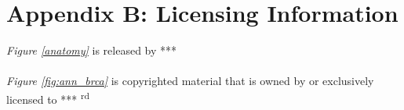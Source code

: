 \documentclass[../thesis.tex]{subfiles}
\begin{document}
\chapter*{Appendix B: Licensing Information}
\label{sec:licensing}

\emph{Figure \ref{anatomy}} is released by ***
\\\\
\emph{Figure \ref{fig:ann_brca}} is copyrighted material that is owned by or exclusively licensed to *** \textsuperscript{rd}
\end{document}
